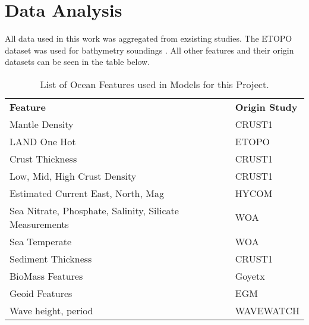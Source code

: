 \section{Data Analysis}
\setlength{\parindent}{10ex}

All data used in this work was aggregated from exsisting studies.
The ETOPO dataset was used for bathymetry soundings \cite{national1988etopo}.
All other features and their origin datasets can be seen in the table below. %

%

\begin{center}
    \begin{table}[htb]
        \begin{tabular}{ |p{} p{}| }
            \hline
                \textbf{Feature} & \textbf{Origin Study} \\
                Mantle Density & CRUST1 \cite{laske2013update} \\
                LAND One Hot & ETOPO \cite{national1988etopo} \\
                Crust Thickness & CRUST1 \cite{laske2013update} \\
                Low, Mid, High Crust Density & CRUST1 \cite{laske2013update} \\
                Estimated Current East, North, Mag & HYCOM \cite{chassignet2009us} \\
                Sea Nitrate, Phosphate, Salinity, Silicate Measurements & WOA \\
                Sea Temperate & WOA \\
                Sediment Thickness & CRUST1 \cite{laske2013update} \\
                BioMass Features & Goyetx \\
                Geoid Features & EGM \cite{pavlis2008earth} \\
                Wave height, period & WAVEWATCH \cite{tolman20072007} \\
            \hline
        \end{tabular}
        \label{table:FEATURE_LIST}
        \caption{List of Ocean Features used in Models for this Project.}
    \end{table}
\end{center}
